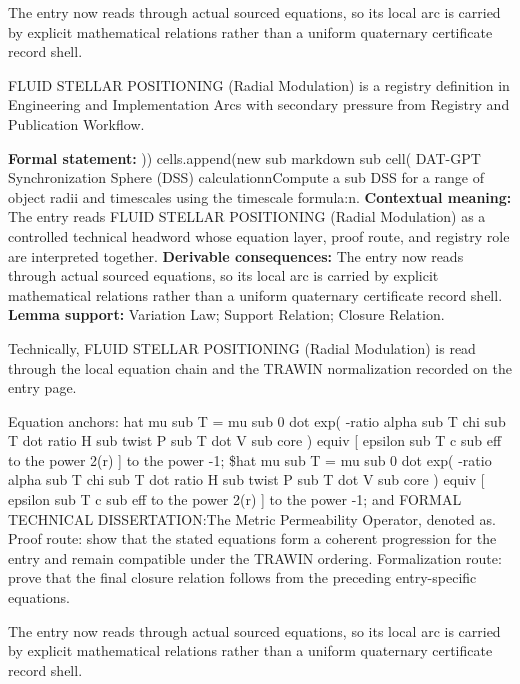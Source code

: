 The entry now reads through actual sourced equations, so its local arc is carried by explicit mathematical relations rather than a uniform quaternary certificate record shell.
\clearpage


\begingroup\small
{}
FLUID STELLAR POSITIONING (Radial Modulation) is a registry definition in Engineering and Implementation Arcs with secondary pressure from Registry and Publication Workflow.

\begingroup\footnotesize\setlength{\emergencystretch}{3em}\sloppy
\textbf{Formal statement:} )) cells.append(new sub markdown sub cell( DAT-GPT Synchronization Sphere (DSS) calculationnCompute a sub DSS for a range of object radii and timescales using the timescale formula:n. \textbf{Contextual meaning:} The entry reads FLUID STELLAR POSITIONING (Radial Modulation) as a controlled technical headword whose equation layer, proof route, and registry role are interpreted together. \textbf{Derivable consequences:} The entry now reads through actual sourced equations, so its local arc is carried by explicit mathematical relations rather than a uniform quaternary certificate record shell. \textbf{Lemma support:} Variation Law; Support Relation; Closure Relation.\par
\endgroup

Technically, FLUID STELLAR POSITIONING (Radial Modulation) is read through the local equation chain and the TRAWIN normalization recorded on the entry page.

Equation anchors: hat mu sub T = mu sub 0 dot exp( -ratio alpha sub T chi sub T dot ratio H sub twist P sub T dot V sub core ) equiv [ epsilon sub T c sub eff to the power 2(r) ] to the power -1; \$hat mu sub T = mu sub 0 dot exp( -ratio alpha sub T chi sub T dot ratio H sub twist P sub T dot V sub core ) equiv [ epsilon sub T c sub eff to the power 2(r) ] to the power -1; and FORMAL TECHNICAL DISSERTATION:The Metric Permeability Operator, denoted as. Proof route: show that the stated equations form a coherent progression for the entry and remain compatible under the TRAWIN ordering. Formalization route: prove that the final closure relation follows from the preceding entry-specific equations.

The entry now reads through actual sourced equations, so its local arc is carried by explicit mathematical relations rather than a uniform quaternary certificate record shell.
\endgroup

